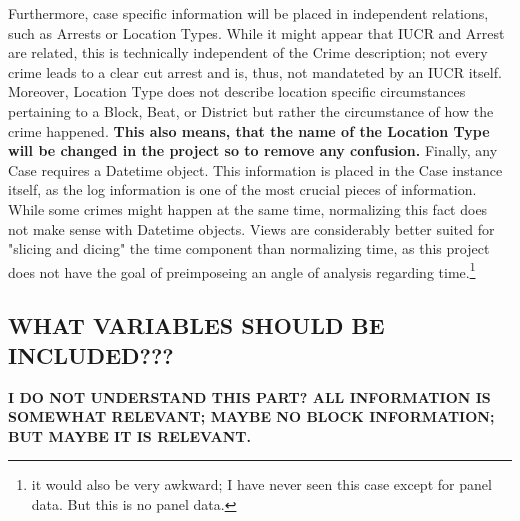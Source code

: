 \documentclass[a4paper]{article}
\begin{document}
\indent Furthermore, case specific information will be placed in independent relations, such as Arrests or Location Types. While it might appear that IUCR and Arrest are related, this is technically independent of the Crime description; not every crime leads to a clear cut arrest and is, thus, not mandateted by an IUCR itself. Moreover, Location Type does not describe location specific circumstances pertaining to a Block, Beat, or District but rather the circumstance of how the crime happened. \textbf{This also means, that the name of the Location Type will be changed in the project so to remove any confusion.} 
\indent Finally, any Case requires a Datetime object. This information is placed in the Case instance itself, as the log information is one of the most crucial pieces of information. While some crimes might happen at the same time, normalizing this fact does not make sense with Datetime objects. Views are considerably better suited for "slicing and dicing" the time component than normalizing time, as this project does not have the goal of preimposeing an angle of analysis regarding time.\footnote{it would also be very awkward; I have never seen this case except for panel data. But this is no panel data.} 



\subsection{WHAT VARIABLES SHOULD BE INCLUDED???}
\textbf{I DO NOT UNDERSTAND THIS PART? ALL INFORMATION IS SOMEWHAT RELEVANT; MAYBE NO BLOCK INFORMATION; BUT MAYBE IT IS RELEVANT.}
\end{document}
